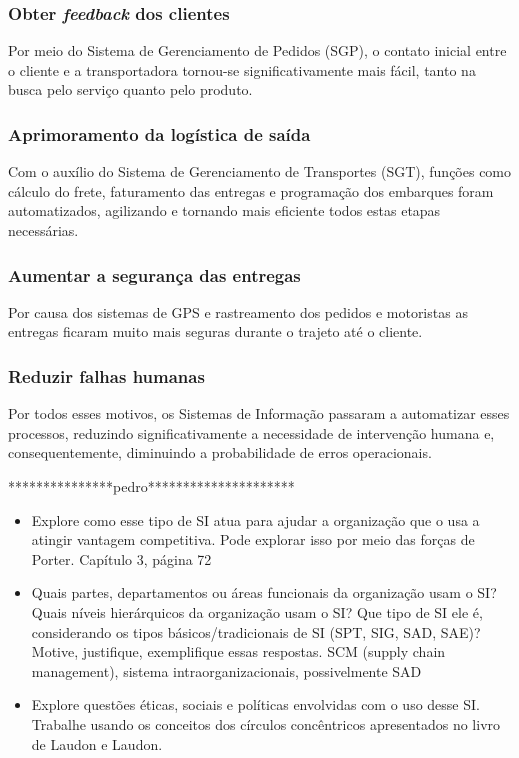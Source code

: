 \documentclass[conference]{IEEEtran}
\begin{document}
\subsubsection{Obter \textit{feedback} dos clientes}
Por meio do Sistema de Gerenciamento de Pedidos (SGP), o contato inicial entre o cliente e a transportadora tornou-se significativamente mais fácil, tanto na busca pelo serviço quanto pelo produto.

\subsubsection{Aprimoramento da logística de saída}
Com o auxílio do Sistema de Gerenciamento de Transportes (SGT), funções como cálculo do frete, faturamento das entregas e programação dos embarques foram automatizados, agilizando e tornando mais eficiente todos estas etapas necessárias.

\subsubsection{Aumentar a segurança das entregas}
Por causa dos sistemas de GPS e rastreamento dos pedidos e motoristas as entregas ficaram muito mais seguras durante o trajeto até o cliente.

\subsubsection{Reduzir falhas humanas}
Por todos esses motivos, os Sistemas de Informação passaram a automatizar esses processos, reduzindo significativamente a necessidade de intervenção humana e, consequentemente, diminuindo a probabilidade de erros operacionais.


***************pedro*********************

\begin{itemize}
    \item  Explore como esse tipo de SI atua para ajudar a organização que o usa a atingir vantagem competitiva. Pode explorar isso por meio das forças de Porter.
    Capítulo 3, página 72
    \item Quais partes, departamentos ou áreas funcionais da organização usam o SI? Quais níveis hierárquicos da organização usam o SI? Que tipo de SI ele é, considerando os tipos básicos/tradicionais de SI (SPT, SIG, SAD, SAE)? Motive, justifique, exemplifique essas respostas.
    SCM (supply chain management), sistema intraorganizacionais, possivelmente SAD
    \item Explore questões éticas, sociais e políticas envolvidas com o uso desse SI. Trabalhe usando os conceitos dos círculos concêntricos apresentados no livro de Laudon e Laudon.
\end{itemize}
\end{document}
